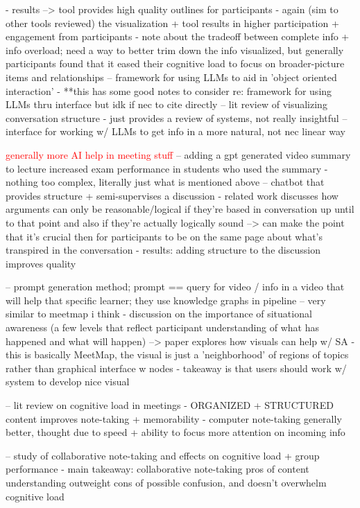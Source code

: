     - results --> tool provides high quality outlines for participants
        - again (sim to other tools reviewed) the visualization + tool results in higher participation + engagement from participants
    - note about the tradeoff between complete info + info overload; need a way to better trim down the info visualized, but generally participants found that it eased their cognitive load to focus on broader-picture items and relationships
\cite{kimCellsGeneratorsLenses2023} -- framework for using LLMs to aid in 'object oriented interaction'
    - **this has some good notes to consider re: framework for using LLMs thru interface but idk if nec to cite directly 
\cite{kimSystematicReviewDyadic2021} -- lit review of visualizing conversation structure
    - just provides a review of systems, not really insightful
\cite{Suh2023SensecapeEM} -- interface for working w/ LLMs to get info in a more natural, not nec linear way


\textcolor{red}{generally more AI help in meeting stuff}
\cite{gonzalezAutomaticallyGeneratedSummaries2023} -- adding a gpt generated video summary to lecture increased exam performance in students who used the summary
    - nothing too complex, literally just what is mentioned above
\cite{kimModeratorChatbotDeliberative2021} -- chatbot that provides structure + semi-supervises a discussion
    - related work discusses how arguments can only be reasonable/logical if they're based in conversation up until to that point and also if they're actually logically sound --> can make the point that it's crucial then for participants to be on the same page about what's transpired in the conversation
    - results: adding structure to the discussion improves quality 



\cite{Jiang2023Graphologue}
\cite{leePromptiverseScalableGeneration2022} -- prompt generation method; prompt == query for video / info in a video that will help that specific learner; they use knowledge graphs in pipeline
\cite{liSupportingDynamicSituation2013} -- very similar to meetmap i think
    - discussion on the importance of situational awareness (a few levels that reflect participant understanding of what has happened and what will happen) --> paper explores how visuals can help w/ SA 
    - this is basically MeetMap, the visual is just a 'neighborhood' of regions of topics rather than graphical interface w nodes
    - takeaway is that users should work w/ system to develop nice visual 



\cite{Jansen2017AnIR} -- lit review on cognitive load in meetings
    - ORGANIZED + STRUCTURED content improves note-taking + memorability
    - computer note-taking generally better, thought due to speed + ability to focus more attention on incoming info

\cite{costley2021collaborative} -- study of collaborative note-taking and effects on cognitive load + group performance
    - main takeaway: collaborative note-taking pros of content understanding outweight cons of possible confusion, and doesn't overwhelm cognitive load

\cite{}